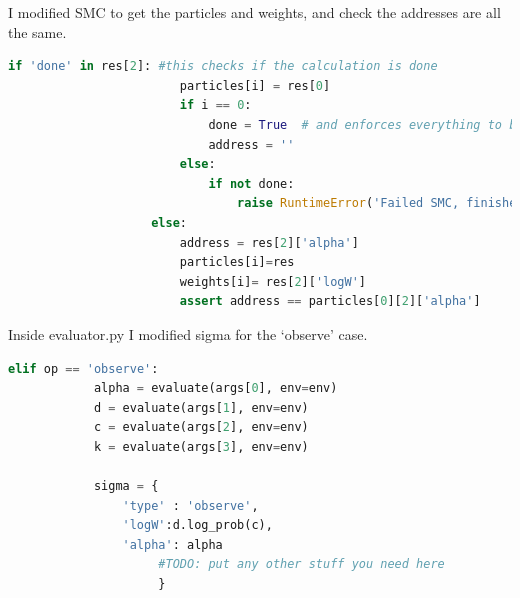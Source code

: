 \documentclass[12pt]{article}%
\theoremstyle{definition}
\begin{document}
		I modified SMC to get the particles and weights, and check the addresses are all the same.
		
		
		\begin{lstlisting}[language=Python]
		if 'done' in res[2]: #this checks if the calculation is done
		                particles[i] = res[0]
		                if i == 0: 
		                    done = True  # and enforces everything to be the same as the first particle
		                    address = ''
		                else:
		                    if not done:
		                        raise RuntimeError('Failed SMC, finished one calculation before the other')
		            else:
		                address = res[2]['alpha']
		                particles[i]=res
		                weights[i]= res[2]['logW']
		                assert address == particles[0][2]['alpha']
		\end{lstlisting}
			
		Inside evaluator.py I modified sigma for the `observe' case.
		
		\begin{lstlisting}[language=Python]
elif op == 'observe':
            alpha = evaluate(args[0], env=env)
            d = evaluate(args[1], env=env)
            c = evaluate(args[2], env=env)
            k = evaluate(args[3], env=env)

            sigma = {
                'type' : 'observe',
                'logW':d.log_prob(c),
                'alpha': alpha
                     #TODO: put any other stuff you need here
                     }
		\end{lstlisting}
		
		
		
		
	
	
	
	
%	
%	
	
	
\end{document}

